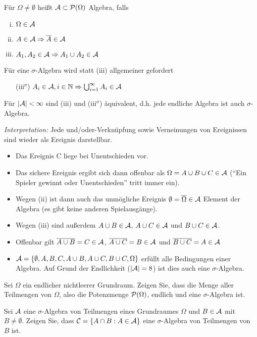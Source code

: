 \solution
Für $\Omega\ne\emptyset$ heißt $\mathcal A\subset\mathcal P(\Omega)$ Algebra, falls
\begin{enumerate}[(i)]
  \item $\Omega\in\mathcal A$
  \item $A\in\mathcal A \Rightarrow \overline A\in\mathcal A$
  \item $A_1,A_2\in\mathcal A \Rightarrow A_1\cup A_2\in\mathcal A$
\end{enumerate}
Für eine $\sigma$-Algebra wird statt (iii) allgemeiner gefordert
\begin{enumerate}
  \item[(iii$^\sigma$)] $A_i\in\mathcal A, i\in\mathbb{N} \Rightarrow \bigcup_{i=1}^\infty A_i\in\mathcal A$
\end{enumerate}
Für $|\mathcal A|<\infty$ sind (iii) und (iii$^\sigma$) äquivalent, d.h. jede endliche Algebra ist auch $\sigma$-Algebra.

\emph{Interpretation:} Jede und/oder-Verknüpfung sowie Verneinungen von Ereignissen sind wieder als Ereignis darstellbar.

\begin{itemize}
  \item Das Ereignis C liege bei Unentschieden vor.
  \item Das sichere Ereignis ergibt sich dann offenbar als $\Omega=A\cup B\cup C \in\mathcal A$
        (``Ein Spieler gewinnt oder Unentschieden'' tritt immer ein).
  \item Wegen (ii) ist dann auch das unmögliche Ereignis $\emptyset=\overline\Omega\in\mathcal A$ Element der Algebra
        (es gibt keine anderen Spielausgänge).
  \item Wegen (iii) sind außerdem $A\cup B\in\mathcal A$, $A\cup C\in\mathcal A$ und $B\cup C\in\mathcal A$.
  \item Offenbar gilt $\overline{A\cup B} = C\in\mathcal A$, $\overline{A\cup C} = B\in\mathcal A$ und $\overline{B\cup C} = A\in\mathcal A$
  \item $\mathcal A=\{\emptyset,A,B,C, A\cup B, A\cup C, B\cup C, \Omega\}$ erfüllt alle Bedingungen einer Algebra.
        Auf Grund der Endlichkeit ($|\mathcal A|=8$) ist dies auch eine $\sigma$-Algebra.
\end{itemize}

Sei $\Omega$ ein endlicher nichtleerer Grundraum. Zeigen Sie, dass die
Menge aller Teilmengen von $\Omega$, also die Potenzmenge $\mathcal P(\Omega)$,
endlich und eine $\sigma$-Algebra ist.

Sei $\mathcal A$ eine $\sigma$-Algebra von Teilmengen eines Grundraumes $\Omega$ und
$B \in \mathcal A$ mit $B\neq \emptyset$. Zeigen Sie, dass $\mathcal C = \left\{ A\cap B :
A\in\mathcal A \right\}$ eine $\sigma$-Algebra von Teilmengen von $B$ ist.

